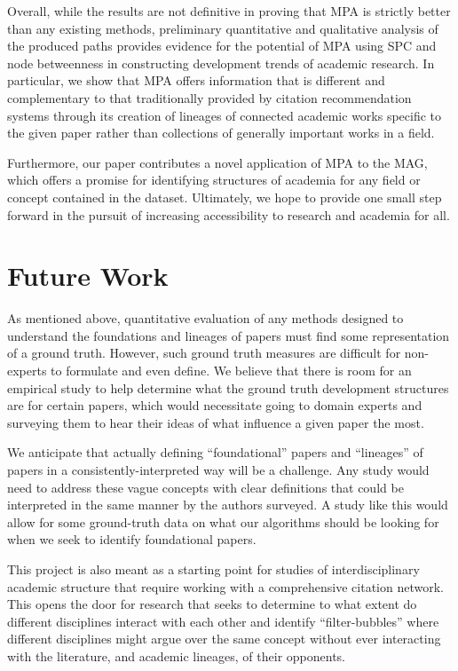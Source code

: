 \documentclass[lettepaper,]{article}
\begin{document}
Overall, while the results are not definitive in proving that MPA is
strictly better than any existing methods, preliminary quantitative and
qualitative analysis of the produced paths provides evidence for the
potential of MPA using SPC and node betweenness in constructing
development trends of academic research. In particular, we show that MPA
offers information that is different and complementary to that
traditionally provided by citation recommendation systems through its
creation of lineages of connected academic works specific to the given
paper rather than collections of generally important works in a field.

Furthermore, our paper contributes a novel application of MPA to the
MAG, which offers a promise for identifying structures of academia for
any field or concept contained in the dataset. Ultimately, we hope to
provide one small step forward in the pursuit of increasing
accessibility to research and academia for all.

\hypertarget{future-work}{%
\section{Future Work}\label{future-work}}

As mentioned above, quantitative evaluation of any methods designed to
understand the foundations and lineages of papers must find some
representation of a ground truth. However, such ground truth measures
are difficult for non-experts to formulate and even define. We believe
that there is room for an empirical study to help determine what the
ground truth development structures are for certain papers, which would
necessitate going to domain experts and surveying them to hear their
ideas of what influence a given paper the most.

We anticipate that actually defining ``foundational'' papers and
``lineages'' of papers in a consistently-interpreted way will be a
challenge. Any study would need to address these vague concepts with
clear definitions that could be interpreted in the same manner by the
authors surveyed. A study like this would allow for some ground-truth
data on what our algorithms should be looking for when we seek to
identify foundational papers.

This project is also meant as a starting point for studies of
interdisciplinary academic structure that require working with a
comprehensive citation network. This opens the door for research that
seeks to determine to what extent do different disciplines interact with
each other and identify ``filter-bubbles'' where different disciplines
might argue over the same concept without ever interacting with the
literature, and academic lineages, of their opponents.
\end{document}

